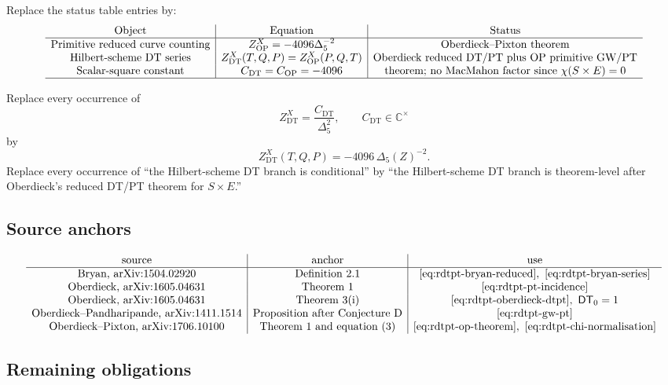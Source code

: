 Replace the status table entries by:
\[
\begin{array}{c|c|c}
\hbox{Object} & \hbox{Equation} & \hbox{Status} \\
\hline
\hbox{Primitive reduced curve counting}
& Z^X_{\mathrm{OP}}=-4096\Delta_5^{-2}
& \hbox{Oberdieck--Pixton theorem} \\
\hbox{Hilbert-scheme DT series}
& Z^X_{\mathrm{DT}}(T,Q,P)=Z^X_{\mathrm{OP}}(P,Q,T)
& \hbox{Oberdieck reduced DT/PT plus OP primitive GW/PT} \\
\hbox{Scalar-square constant}
& C_{\mathrm{DT}}=C_{\mathrm{OP}}=-4096
& \hbox{theorem; no MacMahon factor since }\chi(S\times E)=0 \\
\hline
\end{array}
\]

Replace every occurrence of
\[
Z^X_{\mathrm{DT}}=\frac{C_{\mathrm{DT}}}{\Delta_5^2},
\qquad C_{\mathrm{DT}}\in\mathbb C^\times
\]
by
\[
Z^X_{\mathrm{DT}}(T,Q,P)
=
-4096\,\Delta_5(Z)^{-2}.
\]
Replace every occurrence of ``the Hilbert-scheme DT branch is
conditional'' by ``the Hilbert-scheme DT branch is theorem-level after
Oberdieck's reduced DT/PT theorem for \(S\times E\).''

\subsection{Source anchors}

\[
\begin{array}{c|c|c}
\hbox{source} & \hbox{anchor} & \hbox{use} \\
\hline
\hbox{Bryan, arXiv:1504.02920}
& \hbox{Definition 2.1}
& \eqref{eq:rdtpt-bryan-reduced},\ \eqref{eq:rdtpt-bryan-series} \\
\hbox{Oberdieck, arXiv:1605.04631}
& \hbox{Theorem 1}
& \eqref{eq:rdtpt-pt-incidence} \\
\hbox{Oberdieck, arXiv:1605.04631}
& \hbox{Theorem 3(i)}
& \eqref{eq:rdtpt-oberdieck-dtpt},\ \mathsf{DT}_0=1 \\
\hbox{Oberdieck--Pandharipande, arXiv:1411.1514}
& \hbox{Proposition after Conjecture D}
& \eqref{eq:rdtpt-gw-pt} \\
\hbox{Oberdieck--Pixton, arXiv:1706.10100}
& \hbox{Theorem 1 and equation (3)}
& \eqref{eq:rdtpt-op-theorem},\ \eqref{eq:rdtpt-chi-normalisation}
\end{array}
\]

\subsection{Remaining obligations}

